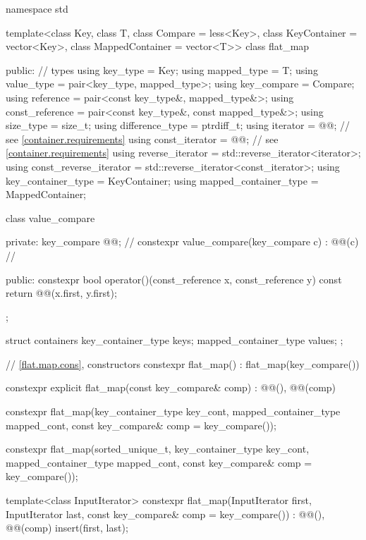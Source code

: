 \begin{codeblock}
namespace std {
  template<class Key, class T, class Compare = less<Key>,
           class KeyContainer = vector<Key>, class MappedContainer = vector<T>>
  class flat_map {
  public:
    // types
    using key_type               = Key;
    using mapped_type            = T;
    using value_type             = pair<key_type, mapped_type>;
    using key_compare            = Compare;
    using reference              = pair<const key_type&, mapped_type&>;
    using const_reference        = pair<const key_type&, const mapped_type&>;
    using size_type              = size_t;
    using difference_type        = ptrdiff_t;
    using iterator               = @@; // see \ref{container.requirements}
    using const_iterator         = @@; // see \ref{container.requirements}
    using reverse_iterator       = std::reverse_iterator<iterator>;
    using const_reverse_iterator = std::reverse_iterator<const_iterator>;
    using key_container_type     = KeyContainer;
    using mapped_container_type  = MappedContainer;

    class value_compare {
    private:
      key_compare @@;                                         // \expos
      constexpr value_compare(key_compare c) : @@(c) { }      // \expos

    public:
      constexpr bool operator()(const_reference x, const_reference y) const {
        return @@(x.first, y.first);
      }
    };

    struct containers {
      key_container_type keys;
      mapped_container_type values;
    };

    // \ref{flat.map.cons}, constructors
    constexpr flat_map() : flat_map(key_compare()) { }

    constexpr explicit flat_map(const key_compare& comp)
      : @@(), @@(comp) { }

    constexpr flat_map(key_container_type key_cont, mapped_container_type mapped_cont,
                       const key_compare& comp = key_compare());

    constexpr flat_map(sorted_unique_t, key_container_type key_cont,
                       mapped_container_type mapped_cont,
                       const key_compare& comp = key_compare());

    template<class InputIterator>
      constexpr flat_map(InputIterator first, InputIterator last,
                         const key_compare& comp = key_compare())
        : @@(), @@(comp) { insert(first, last); }

}}
\end{codeblock}
